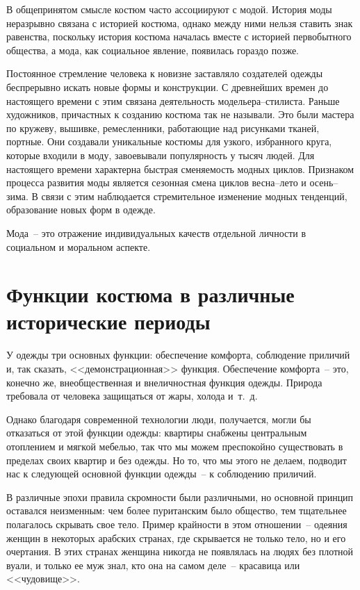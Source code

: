   В общепринятом смысле костюм часто ассоциируют с модой. История моды
  неразрывно связана с историей костюма, однако между ними нельзя ставить знак
  равенства, поскольку история костюма  началась вместе с историей первобытного
  общества, а мода, как социальное явление, появилась гораздо позже.
  
  Постоянное стремление человека к новизне заставляло создателей одежды
  беспрерывно искать новые формы и конструкции. С древнейших времен до
  настоящего времени с этим связана деятельность модельера--стилиста. Раньше
  художников, причастных к созданию костюма так не называли. Это были мастера
  по кружеву, вышивке, ремесленники, работающие над рисунками тканей, портные.
  Они создавали уникальные костюмы для узкого, избранного круга, которые
  входили в моду, завоевывали популярность у тысяч людей. Для настоящего
  времени характерна быстрая сменяемость модных циклов. Признаком процесса
  развития моды является сезонная смена циклов весна--лето и осень--зима. В
  связи с этим наблюдается стремительное изменение модных тенденций,
  образование новых форм в одежде.
  
  Мода~-- это отражение индивидуальных качеств отдельной личности в социальном
  и моральном аспекте.~\cite{bib:0}
  
  \section{Функции костюма в различные исторические периоды}
  
  У одежды три основных функции: обеспечение комфорта, соблюдение приличий и,
  так сказать, <<демонстрационная>> функция. Обеспечение комфорта~-- это,
  конечно же, внеобщественная и внеличностная функция одежды. Природа требовала
  от человека защищаться от жары, холода и~т.~д.
  
  Однако благодаря современной технологии люди, получается, могли бы отказаться
  от этой функции одежды: квартиры снабжены центральным отоплением и мягкой
  мебелью, так что мы можем преспокойно существовать в пределах своих квартир и
  без одежды. Но то, что мы этого не делаем, подводит нас к следующей основной
  функции одежды~-- к соблюдению приличий.
  
  В различные эпохи правила скромности были различными, но основной принцип
  оставался неизменным: чем более пуританским было общество, тем тщательнее
  полагалось скрывать свое тело. Пример крайности в этом отношении~-- одеяния
  женщин в некоторых арабских странах, где скрывается не только тело, но и
  его очертания. В этих странах женщина никогда не появлялась на людях без
  плотной вуали, и только ее муж знал, кто она на самом деле~-- красавица или
  <<чудовище>>.
  
